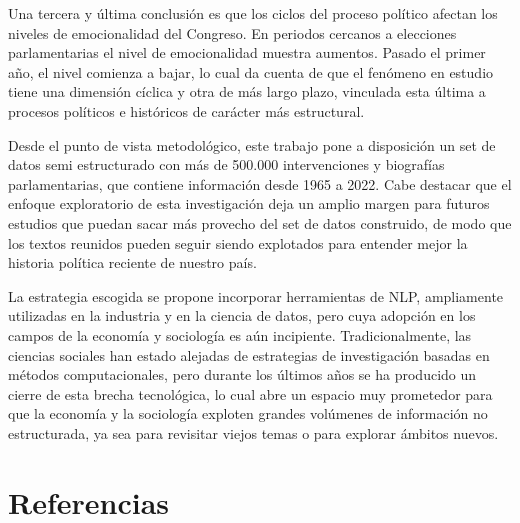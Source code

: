 \documentclass[
  12pt,
]{article}
\begin{document}
Una tercera y última conclusión es que los ciclos del proceso político
afectan los niveles de emocionalidad del Congreso. En periodos cercanos
a elecciones parlamentarias el nivel de emocionalidad muestra aumentos.
Pasado el primer año, el nivel comienza a bajar, lo cual da cuenta de
que el fenómeno en estudio tiene una dimensión cíclica y otra de más
largo plazo, vinculada esta última a procesos políticos e históricos de
carácter más estructural.

Desde el punto de vista metodológico, este trabajo pone a disposición un
set de datos semi estructurado con más de 500.000 intervenciones y
biografías parlamentarias, que contiene información desde 1965 a 2022.
Cabe destacar que el enfoque exploratorio de esta investigación deja un
amplio margen para futuros estudios que puedan sacar más provecho del
set de datos construido, de modo que los textos reunidos pueden seguir
siendo explotados para entender mejor la historia política reciente de
nuestro país.

La estrategia escogida se propone incorporar herramientas de NLP,
ampliamente utilizadas en la industria y en la ciencia de datos, pero
cuya adopción en los campos de la economía y sociología es aún
incipiente. Tradicionalmente, las ciencias sociales han estado alejadas
de estrategias de investigación basadas en métodos computacionales, pero
durante los últimos años se ha producido un cierre de esta brecha
tecnológica, lo cual abre un espacio muy prometedor para que la economía
y la sociología exploten grandes volúmenes de información no
estructurada, ya sea para revisitar viejos temas o para explorar ámbitos
nuevos.

\newpage

\hypertarget{referencias}{%
\section*{Referencias}\label{referencias}}
\end{document}
